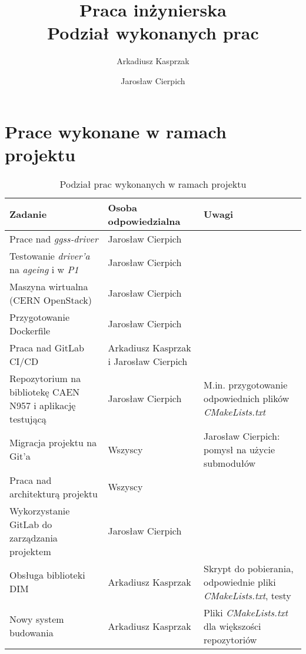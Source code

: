 \documentclass[12pt] {article}
\title {
    \large Praca inżynierska \\ Podział wykonanych prac }
\author {Arkadiusz Kasprzak \and Jarosław Cierpich}
\date{}
\begin{document}
\maketitle

\tableofcontents

\newpage

\section {Prace wykonane w ramach projektu}

\begin{table*}[htbp]
\centering
\caption{Podział prac wykonanych w ramach projektu}
\begin{tabularx}{\textwidth}{@{}XXX@{}}
\toprule
Zadanie & 
Osoba odpowiedzialna & 
Uwagi \\ 

\midrule

Prace nad \textit{ggss-driver} & Jarosław Cierpich & \\
Testowanie \textit{driver'a} na \textit{ageing} i w \textit{P1} & Jarosław Cierpich & \\
Maszyna wirtualna (CERN OpenStack) & Jarosław Cierpich & \\
Przygotowanie Dockerfile & Jarosław Cierpich & \\
Praca nad GitLab CI/CD & Arkadiusz Kasprzak i Jarosław Cierpich & \\


Repozytorium na bibliotekę CAEN N957 i aplikację testującą & Jarosław Cierpich & M.in. przygotowanie odpowiednich plików \textit{CMakeLists.txt} \\
Migracja projektu na Git'a & Wszyscy & Jarosław Cierpich: pomysł na użycie submodułów \\
Praca nad architekturą projektu & Wszyscy & \\
Wykorzystanie GitLab do zarządzania projektem & Jarosław Cierpich & \\



Obsługa biblioteki DIM & Arkadiusz Kasprzak & Skrypt do pobierania, odpowiednie pliki \textit{CMakeLists.txt}, testy \\
Nowy system budowania & Arkadiusz Kasprzak & Pliki \textit{CMakeLists.txt} dla większości repozytoriów \\

\end{tabularx}
\end{table*}
\end{document}
